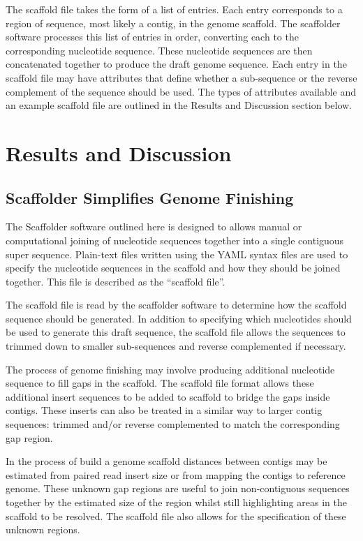 \documentclass[10pt]{bmc_article}
\newenvironment{bmcformat}{\begin{raggedright}\baselineskip20pt\sloppy\setboolean{publ}{false}}{\end{raggedright}\baselineskip20pt\sloppy}
\begin{document}
\begin{bmcformat}
The scaffold file takes the form of a list of entries. Each entry corresponds
to a region of sequence, most likely a contig, in the genome scaffold. The
scaffolder software processes this list of entries in order, converting each to
the corresponding nucleotide sequence. These nucleotide sequences are then
concatenated together to produce the draft genome sequence. Each entry in the
scaffold file may have attributes that define whether a sub-sequence or the
reverse complement of the sequence should be used. The types of attributes
available and an example scaffold file are outlined in the Results and
Discussion section below.  \pb

\clearpage

\section*{Results and Discussion} %

\subsection*{Scaffolder Simplifies Genome Finishing} %

The Scaffolder software outlined here is designed to allows manual or
computational joining of nucleotide sequences together into a single contiguous
super sequence. Plain-text files written using the YAML syntax files are used
to specify the nucleotide sequences in the scaffold and how they should be
joined together. This file is described as the ``scaffold file''. \pb

The scaffold file is read by the scaffolder software to determine how the
scaffold sequence should be generated. In addition to specifying which
nucleotides should be used to generate this draft sequence, the scaffold file
allows the sequences to trimmed down to smaller sub-sequences and reverse
complemented if necessary. \pb

The process of genome finishing may involve producing additional nucleotide
sequence to fill gaps in the scaffold. The scaffold file format allows these
additional insert sequences to be added to scaffold to bridge the gaps inside
contigs. These inserts can also be treated in a similar way to larger contig
sequences: trimmed and/or reverse complemented to match the corresponding gap
region. \pb

In the process of build a genome scaffold distances between contigs may be
estimated from paired read insert size or from mapping the contigs to reference
genome. These unknown gap regions are useful to join non-contiguous sequences
together by the estimated size of the region whilst still highlighting areas in
the scaffold to be resolved. The scaffold file also allows for the
specification of these unknown regions. \pb


\end{bmcformat}
\end{document}
